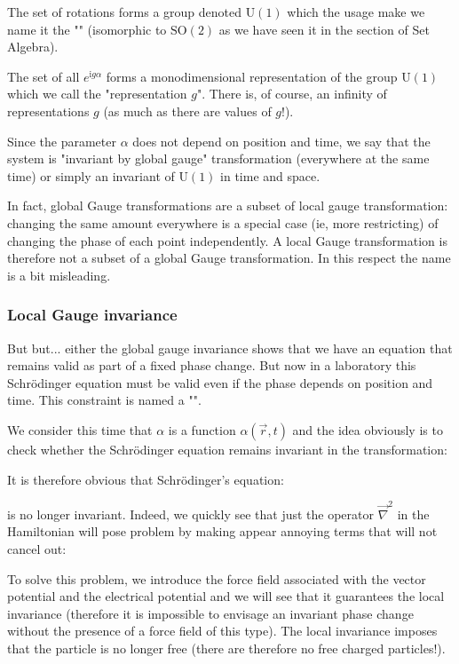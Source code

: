 	The set of rotations forms a group denoted $\text{U}(1)$ which the usage make we name it the "" (isomorphic to $\text{SO}(2)$ as we have seen it in the section of Set Algebra).
	
	The set of all $e^{\mathrm{i}g\alpha}$ forms a monodimensional representation of the group $\text{U}(1)$ which we call the "representation $g$". There is, of course, an infinity of representations $g$ (as much as there are values of $g$!).
	
	Since the parameter $\alpha$ does not depend on position and time, we say that the system is "invariant by global gauge" transformation (everywhere at the same time) or simply an invariant of $\text{U}(1)$ in time and space.
	
	\begin{tcolorbox}[title=Remark,colframe=black,arc=10pt]
	In fact, global Gauge transformations are a subset of local gauge transformation: changing the same amount everywhere is a special case (ie, more restricting) of changing the phase of each point independently. A local Gauge transformation is therefore not a subset of a global Gauge transformation. In this respect the name is a bit misleading.
	\end{tcolorbox}
	
	\pagebreak
	\subsubsection{Local Gauge invariance}
	But but... either the global gauge invariance shows that we have an equation that remains valid as part of a fixed phase change. But now in a laboratory this Schrödinger equation must be valid even if the phase depends on position and time. This constraint is named a "".

	We consider this time that $\alpha$ is a function $\alpha(\vec{r},t)$ and the idea obviously is to check whether the Schrödinger equation remains invariant in the transformation:
	
	It is therefore obvious that Schrödinger's equation:
	
	is no longer invariant. Indeed, we quickly see that just the operator $\vec{\nabla}^2$ in the Hamiltonian will pose problem by making appear annoying terms that will not cancel out:
	
	To solve this problem, we introduce the force field associated with the vector potential and the electrical potential and we will see that it guarantees the local invariance (therefore it is impossible to envisage an invariant phase change without the presence of a force field of this type). The local invariance imposes that the particle is no longer free (there are therefore no free charged particles!).

